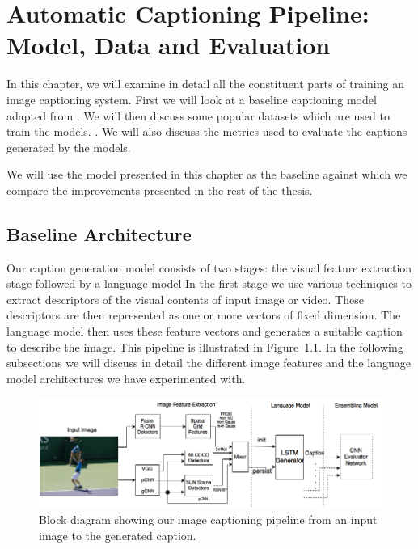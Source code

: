\chapter{Automatic Captioning Pipeline: Model, Data and Evaluation}
\label{chapter:baseline}
In this chapter, we will examine in detail all the constituent parts
of training an image captioning system.
First we will look at a baseline captioning model adapted from
\cite{Vinyals_2015_CVPR}. 
We will then discuss some popular datasets which are used to train the
models. 
. 
We will also discuss the metrics used to evaluate the captions
generated by the models. 

We will use the model presented in this chapter as the baseline
against which we compare the improvements presented in the rest of the
thesis.

\section{Baseline Architecture} 
Our caption generation model consists of two stages: the visual
feature extraction stage followed by a language model
In the first stage we use various techniques to extract descriptors of
the visual contents of input image or video. 
These descriptors are then represented as one or more vectors of fixed
dimension. 
The language model then uses these feature vectors and generates a
suitable caption to describe the image. 
This pipeline is illustrated in Figure~\ref{fig:fullModel}. 
In the following subsections we will discuss in detail the different
image features and the language model architectures we have
experimented with.

\begin{figure}[t]
  \begin{center}
      \hspace{-10mm}\includegraphics[width=1.2\linewidth]{images/AcMM_fullModel.png}
  \end{center}
  \vspace*{-3mm}
  \caption{Block diagram showing our image captioning pipeline from an
  input image to the generated caption.}
  \label{fig:fullModel}
\end{figure}

